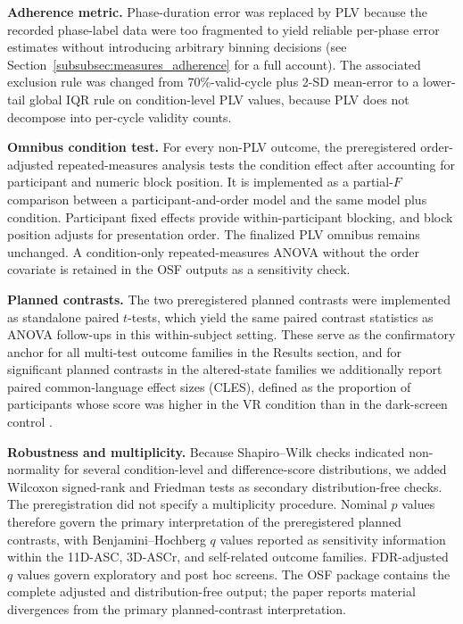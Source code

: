 \documentclass[pdflatex,sn-basic,lineno]{sn-jnl}
\begin{document}
\medskip\noindent\textbf{Adherence metric.} Phase-duration error was replaced by PLV because the recorded phase-label data were too fragmented to yield reliable per-phase error estimates without introducing arbitrary binning decisions (see Section~\ref{subsubsec:measures_adherence} for a full account). The associated exclusion rule was changed from 70\%-valid-cycle plus 2-SD mean-error to a lower-tail global IQR rule on condition-level PLV values, because PLV does not decompose into per-cycle validity counts.

\medskip\noindent\textbf{Omnibus condition test.} For every non-PLV outcome, the preregistered order-adjusted repeated-measures analysis tests the condition effect after accounting for participant and numeric block position. It is implemented as a partial-$F$ comparison between a participant-and-order model and the same model plus condition. Participant fixed effects provide within-participant blocking, and block position adjusts for presentation order. The finalized PLV omnibus remains unchanged. A condition-only repeated-measures ANOVA without the order covariate is retained in the OSF outputs as a sensitivity check.

\medskip\noindent\textbf{Planned contrasts.} The two preregistered planned contrasts were implemented as standalone paired $t$-tests, which yield the same paired contrast statistics as ANOVA follow-ups in this within-subject setting. These serve as the confirmatory anchor for all multi-test outcome families in the Results section, and for significant planned contrasts in the altered-state families we additionally report paired common-language effect sizes (CLES), defined as the proportion of participants whose score was higher in the VR condition than in the dark-screen control \citep{McGraw1992}.

\medskip\noindent\textbf{Robustness and multiplicity.} Because Shapiro--Wilk checks indicated non-normality for several condition-level and difference-score distributions, we added Wilcoxon signed-rank and Friedman tests as secondary distribution-free checks. The preregistration did not specify a multiplicity procedure. Nominal $p$ values therefore govern the primary interpretation of the preregistered planned contrasts, with Benjamini--Hochberg $q$ values reported as sensitivity information within the 11D-ASC, 3D-ASCr, and self-related outcome families. FDR-adjusted $q$ values govern exploratory and post hoc screens. The OSF package contains the complete adjusted and distribution-free output; the paper reports material divergences from the primary planned-contrast interpretation.
\end{document}
